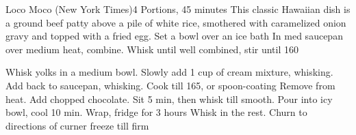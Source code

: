 \documentclass[a6paper,landscape]{article}
\begin{document}
\begin{recipe}{Loco Moco (New York Times)}{4 Portions, 45 minutes}{}
  \freeform This classic Hawaiian dish is a ground beef patty above a pile of white rice, smothered with caramelized onion gravy and topped with a fried egg.
  Set a bowl over an ice bath
  \newstep
  In med saucepan over medium heat, combine. Whisk until well combined, stir until 160\degreeF 

  Whisk yolks in a medium bowl. Slowly add 1 cup of cream mixture, whisking. Add back to saucepan, whisking. Cook till 165\degreeF, or spoon-coating
  Remove from heat. Add chopped chocolate. Sit 5 min, then whisk till smooth.
  \newstep
  Pour into icy bowl, cool 10 min. Wrap, fridge for 3 hours
  Whisk in the rest. 
  \newstep
  Churn to directions of curner
  \newstep
  freeze till firm
  \end{recipe}
\end{document}
